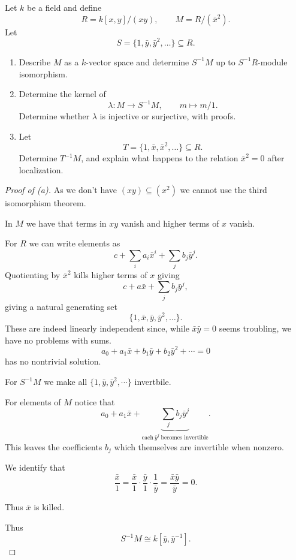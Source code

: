 \documentclass[11pt]{article}
\begin{document}
\begin{prob*}
    Let \(k\) be a field and define
    \[
        R=k[x,y]/(xy),\qquad
        M=R/(\bar x^2).
    \]
    Let
    \[
        S=\{1,\bar y,\bar y^2,\ldots\}
        \subseteq R.
    \]

    \begin{enumerate}[label=\alph*)]
        \item Describe \(M\) as a \(k\)-vector
        space and determine \(S^{-1}M\)
        up to \(S^{-1}R\)-module isomorphism.

        \item Determine the kernel of
        \[
            \lambda:M\longrightarrow S^{-1}M,
            \qquad m\longmapsto m/1.
        \]
        Determine whether \(\lambda\) is injective
        or surjective, with proofs.

        \item Let
        \[
            T=\{1,\bar x,\bar x^2,\ldots\}
            \subseteq R.
        \]
        Determine \(T^{-1}M\), and explain
        what happens to the relation
        \(\bar x^2=0\) after localization.
    \end{enumerate}
\end{prob*}
\begin{proof}[Proof of (a)]
    As we don't have $(xy) \subseteq (x^2)$ we 
    cannot use the third isomorphism theorem. 

    In $M$ we have that terms 
    in $xy$ vanish and higher terms of $x$ vanish. 

    For $R$ we can write elements as 
    \[
        c + \sum_i a_i\bar x^i + \sum_{j} b_j\bar y^j. 
    \]
    Quotienting by $\bar x^2$ kills higher terms 
    of $x$ giving 
    \[
        c + a\bar x + \sum_{j} b_j\bar y^j, 
    \]
    giving a natural generating set 
    \[
        \{1,\bar x, \bar y, \bar y^2, \ldots\}. 
    \]  
    These are indeed linearly independent since, 
    while $\bar x \bar y = 0$ seems troubling, 
    we have no problems with sums. 
    \[
        a_0 + a_1 \bar x + b_1 \bar y 
        + b_2 \bar y^2 + \cdots = 0
    \]
    has no nontrivial solution. 

    For $S^{-1}M$ we make all $\{1,\bar y, \bar y^2, 
    \cdots\}$ invertbile. 

    For elements of $M$ notice that 
    \[
        a_0 + a_1 \bar x + 
        \underbrace{\sum_{j} b_j\bar y^j}_{\text{each} \ \bar y^j \ \text{becomes invertible}}.  
    \]
    This leaves the coefficients $b_j$ which themselves 
    are invertible when nonzero. 

    We identify that 
    \[
        \frac{\bar x}{1} 
        = \frac{\bar x}{1} \cdot 
        \frac{\bar y}{1} \cdot \frac{1}{\bar y} 
        = \frac{\bar x \bar y}{\bar y} 
        = 0. 
    \]

    Thus $\bar x$ is killed. 

    Thus 
    \[
        S^{-1}M \cong k[\bar y, \bar y^{-1}]. 
    \]

\end{proof}
\end{document}

